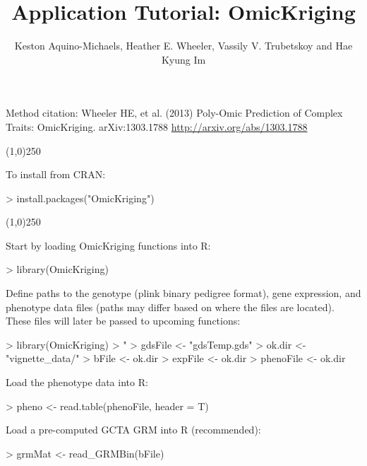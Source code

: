 \documentclass[a4paper]{article}
\title{Application Tutorial: OmicKriging}
\author{Keston Aquino-Michaels, Heather E. Wheeler, Vassily V. Trubetskoy and Hae Kyung Im}
\begin{document}

\maketitle
Method citation: Wheeler HE, et al. (2013) Poly-Omic Prediction of Complex Traits: OmicKriging. arXiv:1303.1788 \url{http://arxiv.org/abs/1303.1788}
\begin{center}
\line(1,0){250}
\end{center}
To install from CRAN:
\begin{Schunk}
\begin{Sinput}
> install.packages("OmicKriging")
\end{Sinput}
\end{Schunk}
\begin{center}
\line(1,0){250}
\end{center}
Start by loading OmicKriging functions into R:
\begin{Schunk}
\begin{Sinput}
> library(OmicKriging)
\end{Sinput}
\end{Schunk}
Define paths to the genotype (plink binary pedigree format), gene expression, and phenotype data files (paths may differ based on where the files are located). These files will later be passed to upcoming functions:
\begin{Schunk}

\begin{Schunk}
\begin{Sinput}
> library(OmicKriging)
> "%&%" <- function(a, b) paste(a, b, sep="")
> gdsFile <- "gdsTemp.gds"
> ok.dir <- "vignette_data/"
> bFile <- ok.dir %&% "ig_genotypes"
> expFile <- ok.dir %&% "ig_gene_exon.txt.gz"
> phenoFile <- ok.dir %&% "ig_pheno.txt"
\end{Sinput}
\end{Schunk}

\end{Schunk}
Load the phenotype data into R:
\begin{Schunk}

\begin{Schunk}
\begin{Sinput}
> pheno <- read.table(phenoFile, header = T)
\end{Sinput}
\end{Schunk}

\end{Schunk}
Load a pre-computed GCTA GRM into R (recommended):
\begin{Schunk}

\begin{Schunk}
\begin{Sinput}
> grmMat <- read_GRMBin(bFile)
\end{Sinput}
\end{Schunk}

\end{Schunk}
\end{document}
